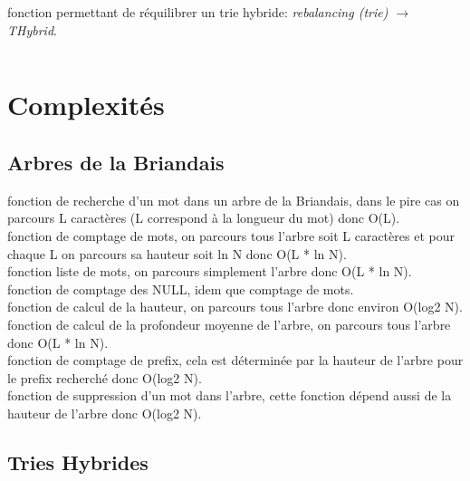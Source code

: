 \documentclass[a4paper,8pt]{report}
\begin{document}
fonction permettant de r\'equilibrer un trie hybride: \textit{rebalancing (trie) $\rightarrow$ THybrid}.
\begin{verbatim}
\end{verbatim}

\chapter{Complexit\'es}
\section*{Arbres de la Briandais}\label{sec:name}

fonction de recherche d'un mot dans un arbre de la Briandais, dans le pire cas on parcours L caract\`eres (L correspond \`a la longueur du mot) donc O(L).\\
fonction de comptage de mots, on parcours tous l'arbre soit L caract\`eres et pour chaque L on parcours sa hauteur soit ln N donc O(L * ln N).\\
fonction liste de mots, on parcours simplement l'arbre donc O(L * ln N).\\
fonction de comptage des NULL, idem que comptage de mots.\\
fonction de calcul de la hauteur, on parcours tous l'arbre donc environ O(log2 N).\\
fonction de calcul de la profondeur moyenne de l'arbre, on parcours tous l'arbre donc O(L * ln N).\\
fonction de comptage de prefix, cela est d\'etermin\'ee par la hauteur de l'arbre pour le prefix recherch\'e donc O(log2 N).\\
fonction de suppression d'un mot dans l'arbre, cette fonction d\'epend aussi de la hauteur de l'arbre donc O(log2 N).\\

\section*{Tries Hybrides}\label{sec:name}
\end{document}
